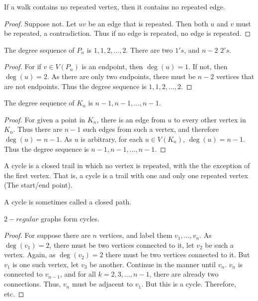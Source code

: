 \documentclass[crop=false,class=book,oneside]{standalone}
\begin{document}
\begin{theorem}
If a walk contains no repeated vertex, then it contains no repeated edge.
\end{theorem}
\begin{proof}
Suppose not. Let $uv$ be an edge that is repeated. Then both $u$ and $v$ must be repeated, a contradiction. Thus if no edge is repeated, no edge is repeated.
\end{proof}
\begin{corollary}
The degree sequence of $P_n$ is $1,1,2,\hdots, 2$. There are two $1's$, and $n-2$ $2's$.
\end{corollary}
\begin{proof}
For if $v\in V(P_n)$ is an endpoint, then $\deg(u) = 1$. If not, then $\deg(u) = 2$. As there are only two endpoints, there must be $n-2$ vertices that are not endpoints. Thus the degree sequence is $1,1,2,\hdots,2$.
\end{proof}
\begin{corollary}
The degree sequence of $K_n$ is $n-1,n-1,\hdots, n-1$.
\end{corollary}
\begin{proof}
For given a point in $K_n$, there is an edge from $u$ to every other vertex in $K_n$. Thus there are $n-1$ such edges from such 
a vertex, and therefore $\deg(u) = n-1$. As $u$ is arbitrary, for each $u\in V(K_n)$, $\deg(u) = n-1$. Thus the degree sequence is $n-1,n-1,\hdots, n-1$.
\end{proof}
\begin{definition}
A cycle is a closed trail in which no vertex is repeated, with the the exception of the first vertex. That is, a cycle is a trail with one and only one repeated vertex (The start/end point).
\end{definition}
\begin{remark}
A cycle is sometimes called a closed path.
\end{remark}
\begin{corollary}
$2-regular$ graphs form cycles.
\end{corollary}
\begin{proof}
For suppose there are $n$ vertices, and label them $v_1,\hdots, v_n$. As $\deg(v_1)=2$, there must be two vertices connected to it, let $v_2$ be such a vertex. Again, as $\deg(v_2)=2$ there must be two vertices connected to it. But $v_1$ is one such vertex, let $v_3$ be another. Continue in the manner until $v_n$. $v_n$ is connected to $v_{n-1}$, and for all $k=2,3,\hdots, n-1$, there are already two connections. Thus, $v_n$ must be adjacent to $v_1$. But this is a cycle. Therefore, etc.
\end{proof}
\end{document}
